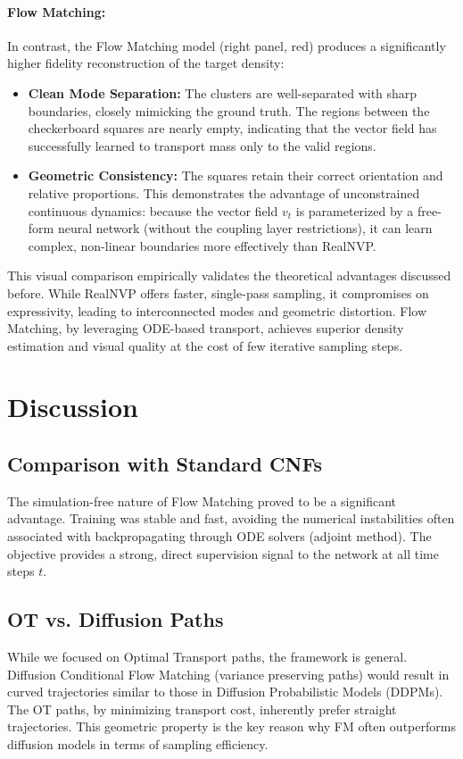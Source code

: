 \documentclass{article}
\begin{document}
\paragraph{Flow Matching:} In contrast, the Flow Matching model (right panel, red) produces a significantly higher fidelity reconstruction of the target density:
\begin{itemize}
    \item \textbf{Clean Mode Separation:} The clusters are well-separated with sharp boundaries, closely mimicking the ground truth. The regions between the checkerboard squares are nearly empty, indicating that the vector field has successfully learned to transport mass only to the valid regions.
    \item \textbf{Geometric Consistency:} The squares retain their correct orientation and relative proportions. This demonstrates the advantage of unconstrained continuous dynamics: because the vector field $v_t$ is parameterized by a free-form neural network (without the coupling layer restrictions), it can learn complex, non-linear boundaries more effectively than RealNVP.
\end{itemize}

This visual comparison empirically validates the theoretical advantages discussed before. While RealNVP offers faster, single-pass sampling, it compromises on expressivity, leading to interconnected modes and geometric distortion. Flow Matching, by leveraging ODE-based transport, achieves superior density estimation and visual quality at the cost of few iterative sampling steps.

\section{Discussion}
\label{sec:discussion}

\subsection{Comparison with Standard CNFs}
The simulation-free nature of Flow Matching proved to be a significant advantage. Training was stable and fast, avoiding the numerical instabilities often associated with backpropagating through ODE solvers (adjoint method). The objective provides a strong, direct supervision signal to the network at all time steps $t$.

\subsection{OT vs. Diffusion Paths}
While we focused on Optimal Transport paths, the framework is general. Diffusion Conditional Flow Matching (variance preserving paths) would result in curved trajectories similar to those in Diffusion Probabilistic Models \cite{ho2020denoisingdiffusionprobabilisticmodels} (DDPMs). The OT paths, by minimizing transport cost, inherently prefer straight trajectories. This geometric property is the key reason why FM often outperforms diffusion models in terms of sampling efficiency.
\end{document}
